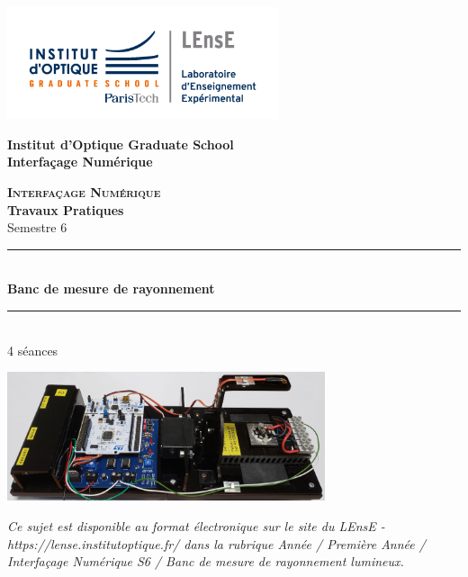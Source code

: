 \documentclass[a4paper,11pt,titlepage]{article} %
\begin{document}
\begin{titlepage}

\begin{center}
	\begin{minipage}{2.5cm}
	\begin{center}
		\includegraphics[width=8cm]{images/Logo-LEnsE.png}
	\end{center}
\end{minipage}\hfill
\begin{minipage}{10cm}
	\begin{center}
	\textbf{Institut d'Optique Graduate School }\\[0.1cm]
    \textbf{Interfaçage Numérique}


	\end{center}
\end{minipage}\hfill


\vspace{4cm}


{\huge \bfseries \textsc{Interfaçage Numérique}} \\[0.5cm]
{\large \bfseries Travaux Pratiques} \\[0.2cm]
Semestre 6

\vspace{2cm}
\rule{\linewidth}{0.3mm} \\[0.4cm]
{ \huge \bfseries\color{violet_iogs} Banc de mesure de rayonnement \\[0.4cm] }
\rule{\linewidth}{0.3mm} \\[1cm]

4 séances

\bigskip

\begin{center}
	\includegraphics[width=0.7\textwidth]{images/rayonnement.png}
\end{center}

\vfill

\textit{Ce sujet est disponible au format électronique sur le site du LEnsE - https://lense.institutoptique.fr/ dans la rubrique Année / Première Année / Interfaçage Numérique S6 / Banc de mesure de rayonnement lumineux.}


\end{center}
\end{titlepage}
\end{document}
